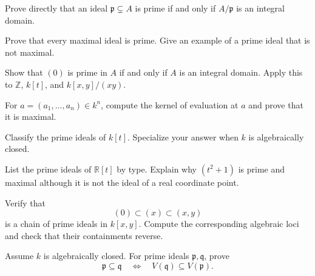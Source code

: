 
\begin{exercise}\label{ex:vi06-prime-quotient}
Prove directly that an ideal \(\mathfrak p\subsetneq A\) is prime if and only if
\(A/\mathfrak p\) is an integral domain.
\end{exercise}

\begin{exercise}\label{ex:vi06-maximal-prime}
Prove that every maximal ideal is prime.  Give an example of a prime ideal that is not
maximal.
\end{exercise}

\begin{exercise}\label{ex:vi06-zero-ideal}
Show that \((0)\) is prime in \(A\) if and only if \(A\) is an integral domain.
Apply this to \(\mathbb Z\), \(k[t]\), and \(k[x,y]/(xy)\).
\end{exercise}

\begin{exercise}\label{ex:vi06-point-ideal}
For \(a=(a_1,\dots,a_n)\in k^n\), compute the kernel of evaluation at \(a\) and prove
that it is maximal.
\end{exercise}

\begin{exercise}\label{ex:vi06-k-t-primes}
Classify the prime ideals of \(k[t]\).  Specialize your answer when \(k\) is algebraically
closed.
\end{exercise}

\begin{exercise}\label{ex:vi06-real-line}
List the prime ideals of \(\mathbb R[t]\) by type.  Explain why \((t^2+1)\) is prime and
maximal although it is not the ideal of a real coordinate point.
\end{exercise}

\begin{exercise}\label{ex:vi06-chain-plane}
Verify that
\[
(0)\subset(x)\subset(x,y)
\]
is a chain of prime ideals in \(k[x,y]\).  Compute the corresponding algebraic loci and
check that their containments reverse.
\end{exercise}

\begin{exercise}\label{ex:vi06-order-reversal}
Assume \(k\) is algebraically closed.  For prime ideals \(\mathfrak p,\mathfrak q\), prove
\[
\mathfrak p\subseteq\mathfrak q
\quad\Longleftrightarrow\quad
V(\mathfrak q)\subseteq V(\mathfrak p).
\]
\end{exercise}

